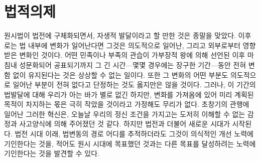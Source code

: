 \chapter{법적의제}

원시법이 법전에 구체화되면서, 자생적 발달이라고 할 만한 것은
종말을 맞았다.
이후로는 법 내부에 변화가 일어난다면 그것은 의도적으로 일어난,
그리고 외부로부터 영향받은 변화인 것이다.
어떤 민족이나 부족의 관습이
가부장적 왕에 의해 선언된 이후 마침내
성문화되어 공표되기까지 그 긴 시간---몇몇 경우에는 장구한 기간---동안
전혀 변함 없이 유지된다는 것은 상상할 수 없는 일이다.
또한 그 변화의 어떤 부분도 의도적으로 일어난 부분이 전혀 없다고
단정하는 것도 옳지만은 않을 것이다.
그러나,
이 기간의 법발달에 대해 우리가 아는 바가 별로 없긴 하지만,
변화를 가져옴에 있어 미리 계획된 목적이 차지하는 몫은
극히 작았을 것이라고 가정해도 무리가 없다.
초창기의 관행에 일어난 그러한 혁신은,
오늘날 우리의 정신 조건을 가지고는 도저히 이해할 수 없는 감정과 사고양식에 의해
주어졌던 것 같다.
하지만 법전과 더불어 새로운 시대가 시작된다.
법전 시대 이래, 법변동의 경로 어디를 추적하더라도
그것이 의식적인 개선 노력에 기인한다는 것을,
적어도 원시 시대에 목표했던 것과는 다른 목표를 달성하려는 노력에
기인한다는 것을 발견할 수 있다.

